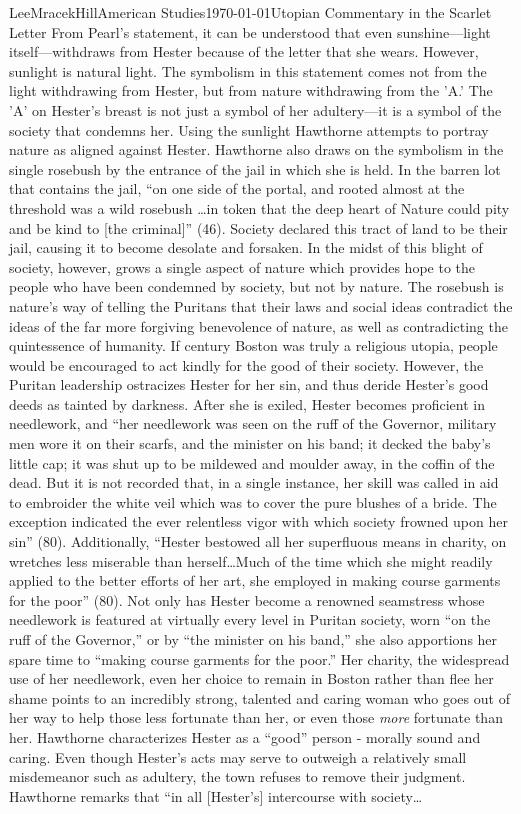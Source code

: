 \documentclass[12pt, letterpaper]{article}
\begin{document}
\begin{mla}{Lee}{Mracek}{Hill}{American Studies}{\today}{Utopian Commentary in the Scarlet Letter}
        From Pearl's statement, it can be understood that even sunshine---light itself---withdraws from Hester because of the letter that she wears. However, sunlight is natural light. The symbolism in this statement comes not from the light withdrawing from Hester, but from nature withdrawing from the 'A.' The 'A' on Hester's breast is not just a symbol of her adultery---it is a symbol of the society that condemns her. Using the sunlight Hawthorne attempts to portray nature as aligned against Hester. Hawthorne also draws on the symbolism in the single rosebush by the entrance of the jail in which she is held. In the barren lot that contains the jail, ``on one side of the portal, and rooted almost at the threshold was a wild rosebush \ldots in token that the deep heart of Nature could pity and be kind to [the criminal]'' (46). Society declared this tract of land to be their jail, causing it to become desolate and forsaken. In the midst of this blight of society, however, grows a single aspect of nature which provides hope to the people who have been condemned by society, but not by nature. The rosebush is nature's way of telling the Puritans that their laws and social ideas contradict the ideas of the far more forgiving benevolence of nature, as well as contradicting the quintessence of humanity. If  century Boston was truly a religious utopia, people would be encouraged to act kindly for the good of their society. However, the Puritan leadership ostracizes Hester for her sin, and thus deride Hester's good deeds as tainted by darkness. After she is exiled, Hester becomes proficient in needlework, and ``her needlework was seen on the ruff of the Governor, military men wore it on their scarfs, and the minister on his band; it decked the baby's little cap; it was shut up to be mildewed and moulder away, in the coffin of the dead. But it is not recorded that, in a single instance, her skill was called in aid to embroider the white veil which was to cover the pure blushes of a bride. The exception indicated the ever relentless vigor with which society frowned upon her sin'' (80). Additionally, ``Hester bestowed all her superfluous means in charity, on wretches less miserable than herself\ldots Much of the time which she might readily applied to the 
        better efforts of her art, she employed in making course garments for the poor'' (80). Not only has Hester become a renowned seamstress whose needlework is featured at virtually every level in Puritan society, worn ``on the ruff of the Governor,'' or by ``the minister on his band,'' she also apportions her spare time to ``making course garments for the poor.'' Her charity, the widespread use of her needlework, even her choice to remain in Boston rather than flee her shame points to an incredibly strong, talented and caring woman who goes out of her way to help those less fortunate than her, or even those \textit{more} fortunate than her. Hawthorne characterizes Hester as a ``good'' person - morally sound and caring. Even though Hester's acts may serve to outweigh a relatively small misdemeanor such as adultery, the town refuses to remove their judgment. Hawthorne remarks that ``in all [Hester's] intercourse with society\ldots 

\end{mla}
\end{document}
